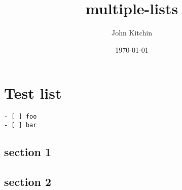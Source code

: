 \documentclass[11pt]{article}
\author{John Kitchin}
\date{\today}
\title{multiple-lists}
\begin{document}
\tableofcontents

\section{Test list}
\label{sec-1}

\label{my-list}
\begin{verbatim}
- [ ] foo
- [ ] bar
\end{verbatim}

\subsection{section 1}
\label{sec-1-1}

\subsection{section 2}
\label{sec-1-2}
\end{document}
